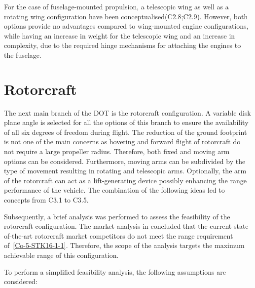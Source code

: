 For the case of fuselage-mounted propulsion, a telescopic wing as well as a rotating wing configuration have been conceptualised(C2.8;C2.9).
However, both options provide no advantages compared to wing-mounted engine configurations, while having an increase in weight for the telescopic wing and an increase in complexity, due to the required hinge mechanisms for attaching the engines to the fuselage.




\section{Rotorcraft}
\label{sec:DesignOptions_Rotorcraft}
The next main branch of the DOT is the rotorcraft configuration.
A variable disk plane angle is selected for all the options of this branch to ensure the availability of all six degrees of freedom during flight.
The reduction of the ground footprint is not one of the main concerns as hovering and forward flight of rotorcraft do not require a large propeller radius.
Therefore, both fixed and moving arm options can be considered.
Furthermore, moving arms can be subdivided by the type of movement resulting in rotating and telescopic arms.
Optionally, the arm of the rotorcraft can act as a lift-generating device possibly enhancing the range performance of the vehicle.
The combination of the following ideas led to concepts from C3.1 to C3.5.

Subsequently, a brief analysis was performed to assess the feasibility of the rotorcraft configuration.
The market analysis in  concluded that the current state-of-the-art rotorcraft market competitors do not meet the range requirement of~\ref{Co-5-STK16-1-1}.
Therefore, the scope of the analysis targets the maximum achievable range of this configuration.

To perform a simplified feasibility analysis, the following assumptions are considered:

